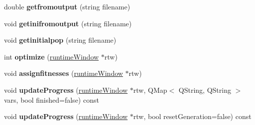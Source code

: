 \begin{DoxyCompactItemize}
double {\bfseries getfromoutput} (string filename)
\item 
\mbox{\label{class_c_g_a_a96de7f54a1dc93665f4ddcbfd56f005b}} 
void {\bfseries getinifromoutput} (string filename)
\item 
\mbox{\label{class_c_g_a_a607a2fb4ed9857372131dba3cdfe272e}} 
void {\bfseries getinitialpop} (string filename)
\item 
\mbox{\label{class_c_g_a_add749989ba5a393969b9ff52a619a017}} 
int {\bfseries optimize} (\hyperlink{classruntime_window}{runtime\+Window} $\ast$rtw)
\item 
\mbox{\label{class_c_g_a_a106aac2c0e76bffcd4f88cc2d97de302}} 
void {\bfseries assignfitnesses} (\hyperlink{classruntime_window}{runtime\+Window} $\ast$rtw)
\item 
\mbox{\label{class_c_g_a_ad3e7ead4060045143e5b8e42de3b5330}} 
void {\bfseries update\+Progress} (\hyperlink{classruntime_window}{runtime\+Window} $\ast$rtw, Q\+Map$<$ Q\+String, Q\+String $>$ vars, bool finished=false) const
\item 
\mbox{\label{class_c_g_a_a761508f4ba331935dafac0024a051d3f}} 
void {\bfseries update\+Progress} (\hyperlink{classruntime_window}{runtime\+Window} $\ast$rtw, bool reset\+Generation=false) const
\end{DoxyCompactItemize}
